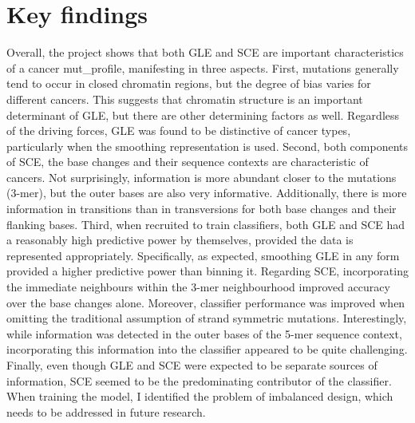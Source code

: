 \section{Key findings}
\label{intro:findings}
Overall, the project shows that both GLE and SCE are important characteristics of a cancer \gls{mut_profile}, manifesting in three aspects. First, mutations generally tend to occur in closed chromatin regions, but the degree of bias varies for different cancers. This suggests that chromatin structure is an important determinant of GLE, but there are other determining factors as well. Regardless of the driving forces, GLE was found to be distinctive of cancer types, particularly when the smoothing representation is used. Second, both components of SCE, the base changes and their sequence contexts are characteristic of cancers. Not surprisingly, information is more abundant closer to the mutations (3-mer), but the outer bases are also very informative. Additionally, there is more information in \glspl{transition} than in \glspl{transversion} for both base changes and their flanking bases. Third, when recruited to train classifiers, both GLE and SCE had a reasonably high predictive power by themselves, provided the data is represented appropriately. Specifically, as expected, smoothing GLE in any form provided a higher predictive power than binning it. Regarding SCE, incorporating the immediate neighbours within the 3-mer neighbourhood improved accuracy over the base changes alone. Moreover, classifier performance was improved when omitting the traditional assumption of strand symmetric mutations. Interestingly, while information was detected in the outer bases of the 5-mer sequence context, incorporating this information into the classifier appeared to be quite challenging. Finally, even though GLE and SCE were expected to be separate sources of information, SCE seemed to be the predominating contributor of the classifier. When training the model, I identified the problem of imbalanced design, which needs to be addressed in future research.   


